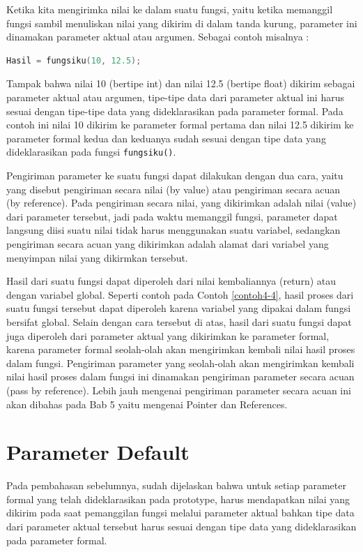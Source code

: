 Ketika kita mengirimka nilai ke dalam suatu fungsi, yaitu ketika
memanggil fungsi sambil menuliskan nilai yang dikirim di dalam tanda
kurung, parameter ini dinamakan parameter aktual atau argumen. Sebagai
contoh misalnya :

\begin{lstlisting}[language=c++, numbers=none]
Hasil = fungsiku(10, 12.5);  
\end{lstlisting}

Tampak bahwa nilai 10 (bertipe int) dan nilai 12.5 (bertipe float)
dikirim sebagai parameter aktual atau argumen, tipe-tipe data dari
parameter aktual ini harus sesuai dengan tipe-tipe data yang
dideklarasikan pada parameter formal. Pada contoh ini nilai 10 dikirim
ke parameter formal pertama dan nilai 12.5 dikirim ke parameter formal
kedua dan keduanya sudah sesuai dengan tipe data yang dideklarasikan
pada fungsi \texttt{fungsiku()}.

Pengiriman parameter ke suatu fungsi dapat dilakukan dengan dua cara,
yaitu yang disebut pengiriman secara nilai (by value) atau pengiriman
secara acuan (by reference). Pada pengiriman secara nilai, yang
dikirimkan adalah nilai (value) dari parameter tersebut, jadi pada waktu
memanggil fungsi, parameter dapat langsung diisi suatu nilai tidak harus
menggunakan suatu variabel, sedangkan pengiriman secara acuan yang
dikirimkan adalah alamat dari variabel yang menyimpan nilai yang
dikirmkan tersebut.

Hasil dari suatu fungsi dapat diperoleh dari nilai kembaliannya (return)
atau dengan variabel global. Seperti contoh pada Contoh \ref{contoh4-4}, hasil proses
dari suatu fungsi tersebut dapat diperoleh karena variabel yang dipakai
dalam fungsi bersifat global. Selain dengan cara tersebut di atas, hasil
dari suatu fungsi dapat juga diperoleh dari parameter aktual yang
dikirimkan ke parameter formal, karena parameter formal seolah-olah akan
mengirimkan kembali nilai hasil proses dalam fungsi. Pengiriman
parameter yang seolah-olah akan mengirimkan kembali nilai hasil proses
dalam fungsi ini dinamakan pengiriman parameter secara acuan (pass by
reference). Lebih jauh mengenai pengiriman parameter secara acuan ini
akan dibahas pada Bab 5 yaitu mengenai Pointer dan References.

\section{Parameter Default}\label{parameter-default}

Pada pembahasan sebelumnya, sudah dijelaskan bahwa untuk setiap
parameter formal yang telah dideklarasikan pada prototype, harus
mendapatkan nilai yang dikirim pada saat pemanggilan fungsi melalui
parameter aktual bahkan tipe data dari parameter aktual tersebut harus
sesuai dengan tipe data yang dideklarasikan pada parameter formal.

